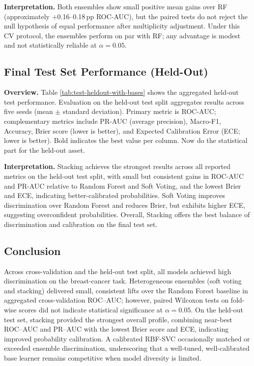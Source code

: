 \documentclass[conference]{IEEEtran}
\begin{document}
\textbf{Interpretation.} Both ensembles show small positive mean gains over RF (approximately \(+\)0.16--0.18\,pp ROC-AUC), but the paired tests do not reject the null hypothesis of equal performance after multiplicity adjustment. Under this CV protocol, the ensembles perform on par with RF; any advantage is modest and not statistically reliable at \(\alpha = 0.05\).

\subsection{Final Test Set Performance (Held-Out)}

\textbf{Overview.} Table \ref{tab:test-heldout-with-bases} shows the aggregated held-out test performance. Evaluation on the held-out test split aggregates results across five seeds (mean \(\pm\) standard deviation). Primary metric is ROC-AUC; complementary metrics include PR-AUC (average precision), Macro-F1, Accuracy, Brier score (lower is better), and Expected Calibration Error (ECE; lower is better). Bold indicates the best value per column.
Now do the statistical part for the held-out asset. 

\textbf{Interpretation.} Stacking achieves the strongest results across all reported metrics on the held-out test split, with small but consistent gains in ROC-AUC and PR-AUC relative to Random Forest and Soft Voting, and the lowest Brier and ECE, indicating better-calibrated probabilities. Soft Voting improves discrimination over Random Forest and reduces Brier, but exhibits higher ECE, suggesting overconfident probabilities. Overall, Stacking offers the best balance of discrimination and calibration on the final test set.


\subsection{\textbf{Conclusion}}

Across cross-validation and the held-out test split, all models achieved high discrimination on the breast-cancer task. Heterogeneous ensembles (soft voting and stacking) delivered small, consistent lifts over the Random Forest baseline in aggregated cross-validation ROC--AUC; however, paired Wilcoxon tests on fold-wise scores did not indicate statistical significance at \(\alpha=0.05\). On the held-out test set, stacking provided the strongest overall profile, combining near-best ROC--AUC and PR--AUC with the lowest Brier score and ECE, indicating improved probability calibration. A calibrated RBF-SVC occasionally matched or exceeded ensemble discrimination, underscoring that a well-tuned, well-calibrated base learner remains competitive when model diversity is limited.
\end{document}

